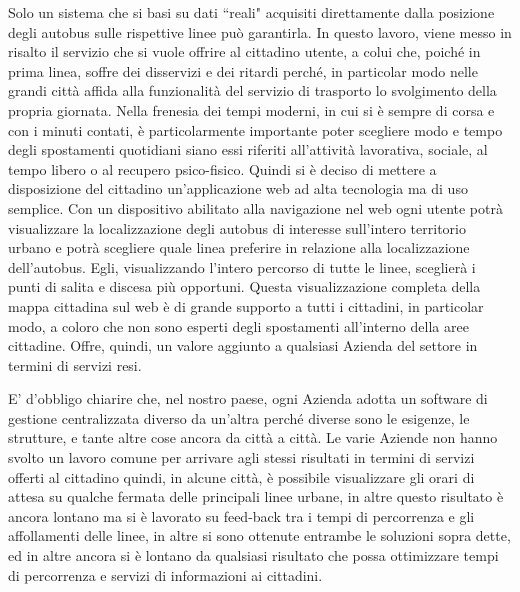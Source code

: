Solo un sistema che si basi su dati ``reali" acquisiti direttamente dalla posizione degli autobus sulle rispettive linee può garantirla.
In questo lavoro, viene messo in risalto il servizio che si vuole offrire al cittadino utente, a colui che, poiché in prima linea, soffre dei disservizi e dei ritardi perché, in particolar modo nelle grandi città affida alla funzionalità del servizio di trasporto lo svolgimento della propria giornata. Nella frenesia dei tempi moderni, in cui si è sempre di corsa e con i minuti contati, è particolarmente importante poter scegliere modo e tempo degli spostamenti quotidiani siano essi riferiti all’attività lavorativa, sociale, al tempo libero o al recupero psico-fisico. Quindi si è deciso di mettere a disposizione del cittadino un’applicazione web ad alta tecnologia  ma di uso semplice.  Con un dispositivo abilitato alla navigazione nel web ogni utente potrà visualizzare la localizzazione degli autobus di interesse sull’intero territorio urbano e potrà scegliere quale linea preferire in relazione alla localizzazione dell’autobus. Egli, visualizzando l’intero percorso di tutte le linee, sceglierà i punti di salita e discesa più opportuni. Questa visualizzazione completa della mappa cittadina sul web è di grande supporto a tutti i cittadini, in particolar modo, a coloro che non sono esperti degli spostamenti all’interno della aree cittadine. Offre, quindi, un valore aggiunto a qualsiasi Azienda del settore in termini di servizi resi.

E’ d’obbligo chiarire che, nel nostro paese, ogni Azienda adotta un software di gestione centralizzata diverso da un’altra perché diverse sono le esigenze, le strutture, e tante altre cose ancora da città a città. Le varie Aziende non hanno svolto un lavoro comune per arrivare agli stessi risultati in  termini di servizi offerti al cittadino quindi, in alcune città, è possibile visualizzare gli orari di attesa su qualche fermata delle principali linee urbane, in altre questo risultato è ancora lontano ma si è lavorato su feed-back tra i tempi di percorrenza e gli affollamenti delle linee, in altre si sono ottenute entrambe le soluzioni sopra dette, ed in altre ancora si è lontano da  qualsiasi risultato che possa ottimizzare tempi di percorrenza e servizi di informazioni ai cittadini.

